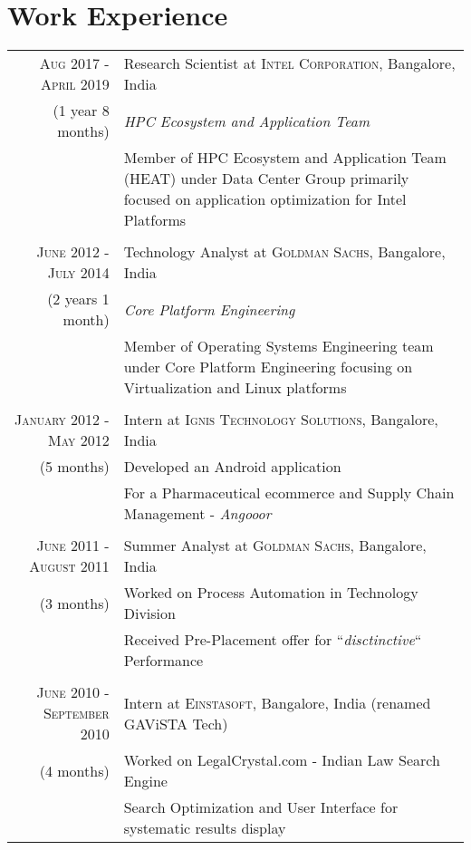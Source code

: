 \documentclass[a4paper,10pt]{article} %
\begin{document}

\section{Work Experience}

\begin{tabular}{r|p{10cm}}
\textsc{Aug 2017 - April 2019} & Research Scientist at \textsc{Intel Corporation}, Bangalore, India \\
{(1 year 8 months)}& \emph{HPC Ecosystem and Application Team}\\ 
& \footnotesize{ Member of HPC Ecosystem and Application Team (HEAT) under Data Center Group primarily focused on application optimization for Intel Platforms} \\
& \\

\textsc{June 2012 - July 2014} & Technology Analyst at \textsc{Goldman Sachs}, Bangalore, India \\
{(2 years 1 month)}& \emph{Core Platform Engineering}\\ 
& \footnotesize{ Member of Operating Systems Engineering team under Core Platform \hbox{Engineering} focusing on Virtualization and Linux platforms } \\
& \\

\textsc{January 2012 - May 2012} & Intern at \textsc{Ignis Technology Solutions}, Bangalore, India \\
{(5 months)}& \footnotesize{ Developed an Android application }\\
& \footnotesize{ For a Pharmaceutical ecommerce and Supply Chain Management - \textit{Angooor} }\\
& \\


\textsc{June 2011 - August 2011} & Summer Analyst at \textsc{Goldman Sachs}, Bangalore, India \\
{(3 months)}& \footnotesize{ Worked on Process Automation in Technology Division }\\
& \footnotesize{ Received Pre-Placement offer for ``\emph{disctinctive}`` Performance }\\
& \\


\textsc{June 2010 - September 2010} & Intern at \textsc{Einstasoft}, Bangalore, India \scriptsize{(renamed GAViSTA Tech)}\\
{(4 months)} & \footnotesize{ Worked on LegalCrystal.com - Indian Law Search Engine }\\
& \footnotesize{ Search Optimization and User Interface for systematic results display }\\


\end{tabular}
\end{document}
